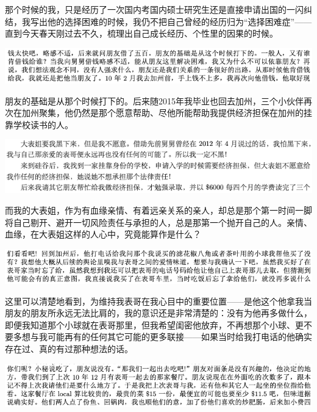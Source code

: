 \documentclass[9pt, b5paper]{article}
\begin{document}
那个时候的我，只是经历了一次国内考国内硕士研究生还是直接申请出国的一闪纠结，我写出他的选择困难的时候，我仍不把自己曾经的经历归为“选择困难症”——直到今天春天刚过去不久，梳理出自己成长经历、个性里的因果的时候。 

\begin{center}
\includegraphics[width=.9\linewidth]{./pic/backups_plans_20210501_124113.png}
\end{center}

朋友的基础是从那个时候打下的。后来随2015年我毕业也回去加州，三个小伙伴再次在加州聚集，他仍然是那个愿意帮助、尽他所能帮助我提供经济担保在加州的挂靠学校读书的人。

\begin{center}
\includegraphics[width=.9\linewidth]{./pic/backups_plans_20210501_124352.png}
\end{center}

而我的大表姐，作为有血缘亲情、有着远亲关系的亲人，却总是那个第一时间一脚将自己剔开、避开一切风险责任与承担的人，总是那第一个抛开自己的人。亲情、血缘，在大表姐这样的人心中，究竟能算作是什么？

\begin{center}
\includegraphics[width=.9\linewidth]{./pic/backups_plans_20210501_124553.png}
\end{center}

这里可以清楚地看到，为维持我表哥在我心目中的重要位置——是他这个他拿我当朋友的朋友所永远无法比肩的，我的意识还是非常清楚的：没有为他再多做什么，即便我知道那个小球就在表哥那里，但我希望闺密他放弃，不再想那个小球、更不要多想与我可能再有的任何其它可能的更多联接——如果当时给我打电话的他确实存在过、真的有过那种想法的话。 

\begin{center}
\includegraphics[width=.9\linewidth]{./pic/backups_plans_20210501_124948.png}
\end{center}
\end{document}
